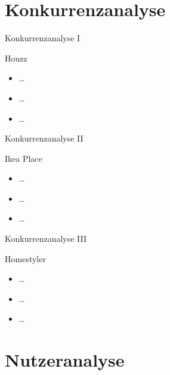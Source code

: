 \documentclass[presentation,bigger,aspectratio=169]{beamer}
\begin{document}
\section{Konkurrenzanalyse}
\label{sec:org5121f43}
\begin{frame}[label={sec:org9818f78}]{\vspace{2.2cm}\begin{center}\MakeUppercase{\insertsection}\end{center}}
\end{frame}

\begin{frame}[label={sec:orgb111aad}]{Konkurrenzanalyse I}
\begin{block}{Houzz}
\begin{itemize}
\item \ldots{}
\item \ldots{}
\item \ldots{}
\end{itemize}
\end{block}
\end{frame}
\begin{frame}[label={sec:org6baf1ee}]{Konkurrenzanalyse II}
\begin{block}{Ikea Place}
\begin{itemize}
\item \ldots{}
\item \ldots{}
\item \ldots{}
\end{itemize}
\end{block}
\end{frame}
\begin{frame}[label={sec:orgd4ad7bc}]{Konkurrenzanalyse III}
\begin{block}{Homestyler}
\begin{itemize}
\item \ldots{}
\item \ldots{}
\item \ldots{}
\end{itemize}
\end{block}
\end{frame}
\section{Nutzeranalyse}
\label{sec:orgc9fc82d}
\begin{frame}[label={sec:orgb3dde0a}]{\vspace{2.2cm}\begin{center}\MakeUppercase{\insertsection}\end{center}}
\end{frame}
\end{document}
